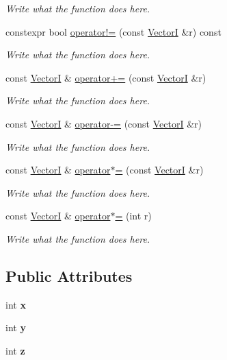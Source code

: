 \begin{DoxyCompactItemize}
\begin{DoxyCompactList}\small\item\em Write what the function does here. \end{DoxyCompactList}\item 
constexpr bool \hyperlink{structVectorI_aab54353aaaac68e4c8ae223944dd09f1}{operator!=} (const \hyperlink{structVectorI}{Vector\+I} \&r) const 
\begin{DoxyCompactList}\small\item\em Write what the function does here. \end{DoxyCompactList}\item 
const \hyperlink{structVectorI}{Vector\+I} \& \hyperlink{structVectorI_af16ac9b6740a45ca43a9752cc9e40baa}{operator+=} (const \hyperlink{structVectorI}{Vector\+I} \&r)
\begin{DoxyCompactList}\small\item\em Write what the function does here. \end{DoxyCompactList}\item 
const \hyperlink{structVectorI}{Vector\+I} \& \hyperlink{structVectorI_ada96d53163f7b91fe105fae26787985f}{operator-\/=} (const \hyperlink{structVectorI}{Vector\+I} \&r)
\begin{DoxyCompactList}\small\item\em Write what the function does here. \end{DoxyCompactList}\item 
const \hyperlink{structVectorI}{Vector\+I} \& \hyperlink{structVectorI_a8f22c2de2c8daddc1765b77a6c2b677b}{operator$\ast$=} (const \hyperlink{structVectorI}{Vector\+I} \&r)
\begin{DoxyCompactList}\small\item\em Write what the function does here. \end{DoxyCompactList}\item 
const \hyperlink{structVectorI}{Vector\+I} \& \hyperlink{structVectorI_aae795a0dad05eba4e9aa4dce4df2d66a}{operator$\ast$=} (int r)
\begin{DoxyCompactList}\small\item\em Write what the function does here. \end{DoxyCompactList}\end{DoxyCompactItemize}
\subsection*{Public Attributes}
\begin{DoxyCompactItemize}
\item 
\hypertarget{structVectorI_a1ad1dc3cfb9e92768acfdd55a5a03dd3}{int {\bfseries x}}\label{structVectorI_a1ad1dc3cfb9e92768acfdd55a5a03dd3}

\item 
\hypertarget{structVectorI_abe21d4e3b37805d5d71af46902b9d8ad}{int {\bfseries y}}\label{structVectorI_abe21d4e3b37805d5d71af46902b9d8ad}

\item 
\hypertarget{structVectorI_a719998755aaf910545bf2bbacb5c9306}{int {\bfseries z}}\label{structVectorI_a719998755aaf910545bf2bbacb5c9306}

\end{DoxyCompactItemize}
